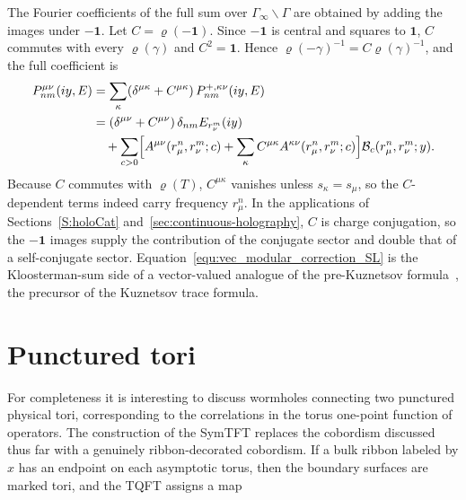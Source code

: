 \documentclass[11pt]{article}
\numberwithin{equation}{section}
\begin{document}
The Fourier coefficients of the full sum over $\Gamma_\infty\backslash\Gamma$ are
obtained by adding the images under $-\mathbf 1$. Let $C=\varrho(-\mathbf 1)$. Since
$-\mathbf 1$ is central and squares to $\mathbf 1$, $C$ commutes with every
$\varrho(\gamma)$ and $C^2=\mathbf 1$. Hence $\varrho(-\gamma)^{-1}=C\varrho(\gamma)^{-1}$,
and the full coefficient is
\begin{equation}
\begin{aligned}
  P_{nm}^{\mu\nu}(iy,E)
  &=\sum_\kappa(\delta^{\mu\kappa}+C^{\mu\kappa})\,
    P_{nm}^{+,\kappa\nu}(iy,E)\\
  &=(\delta^{\mu\nu}+C^{\mu\nu})\,\delta_{nm}E_{r_\nu^m}(iy)\\
  &\quad+\sum_{c>0}\Bigl[
  A^{\mu\nu}(r_\mu^n,r_\nu^m;c)
  +\sum_\kappa C^{\mu\kappa}A^{\kappa\nu}(r_\mu^n,r_\nu^m;c)
  \Bigr]\mathcal B_c(r_\mu^n,r_\nu^m;y).
\end{aligned}
\label{equ:vec_modular_correction_SL}
\end{equation}
Because $C$ commutes with $\varrho(T)$, $C^{\mu\kappa}$ vanishes unless
$s_\kappa=s_\mu$, so the $C$-dependent terms indeed carry frequency $r_\mu^n$. In the
applications of Sections~\ref{S:holoCat} and~\ref{sec:continuous-holography}, $C$ is
charge conjugation, so the $-\mathbf 1$ images supply the contribution of the conjugate
sector and double that of a self-conjugate sector.
Equation~\eqref{equ:vec_modular_correction_SL} is the Kloosterman-sum side of a
vector-valued analogue of the pre-Kuznetsov formula~\cite{Iwaniec2002SpectralMO}, the
precursor of the Kuznetsov trace formula.

\section{Punctured tori}

For completeness it is interesting to discuss wormholes connecting two punctured physical tori, corresponding to the correlations in the torus one-point function of operators. The construction of the SymTFT replaces the cobordism discussed thus far 
with a genuinely ribbon-decorated cobordism. If a bulk ribbon labeled by $x$ has an endpoint on each asymptotic torus, then the boundary surfaces are marked tori, and the TQFT assigns a map
\end{document}
